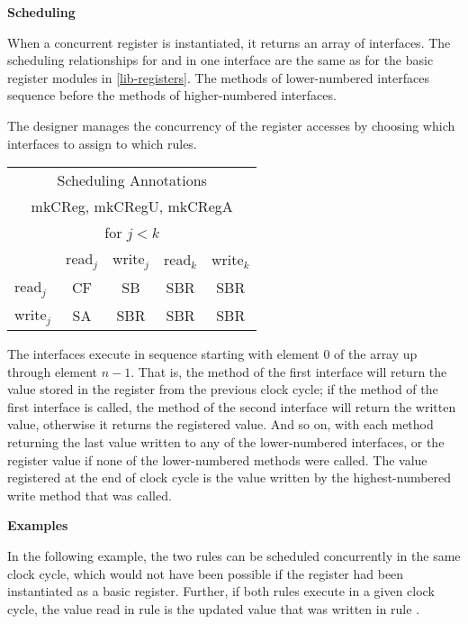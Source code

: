 {\bf Scheduling}

When a concurrent register is instantiated, it returns an array of 
interfaces.  The scheduling relationships for  and  in
one  interface are the same as for the basic register modules in
\ref{lib-registers}.  The methods of lower-numbered interfaces sequence
before the methods of higher-numbered interfaces.

The designer manages the concurrency of the register accesses by choosing
which interfaces to assign to which rules.

\begin{center}
\begin{tabular}{|p{.75 in}||c|c||c|c||}
\hline
\multicolumn{5}{|c|}{Scheduling Annotations}\\
\multicolumn{5}{|c|}{mkCReg, mkCRegU, mkCRegA}\\
\multicolumn{5}{|c|}{for $j < k$}\\
\hline
& {read$_j$} & {write$_j$} & {read$_k$} & {write$_k$} \\
\hline
\hline
{read$_j$} & CF & SB & SBR & SBR \\
\hline
{write$_j$} & SA & SBR & SBR & SBR \\
\hline
\hline
\end{tabular}
\end{center}

The  interfaces execute in sequence starting with element $0$ of the
array up through element $n-1$.  That is, the  method of the first
interface will return the value stored in the register from the previous
clock cycle; if the  method of the first interface is called,
the  method of the second interface will return the written value,
otherwise it returns the registered value.  And so on, with each 
method returning the last value written to any of the lower-numbered
interfaces, or the register value if none of the lower-numbered 
methods were called.  The value registered at the end of clock cycle is the
value written by the highest-numbered write method that was called.

{\bf Examples}

In the following example, the two rules can be scheduled concurrently in
the same clock cycle, which would not have been possible if the register
 had been instantiated as a basic  register.
Further, if both rules execute in a given clock cycle, the value read in
rule  is the updated value that was written in rule .

